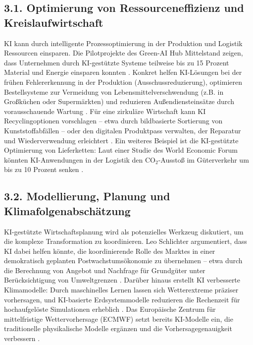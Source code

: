\documentclass[12pt, a4paper]{article}
\begin{document}
	\subsection*{3.1. Optimierung von Ressourceneffizienz und Kreislaufwirtschaft}
	KI kann durch intelligente Prozessoptimierung in der Produktion und Logistik
	Ressourcen einsparen.
	Die Pilotprojekte des Green-AI Hub Mittelstand zeigen, dass
	Unternehmen durch KI-gestützte Systeme teilweise bis zu 15 Prozent Material und
	Energie einsparen konnten \cite{greenai2025}.
	Konkret helfen KI-Lösungen bei der
	frühen Fehlererkennung in der Produktion (Ausschussreduzierung), optimieren
	Bestellsysteme zur Vermeidung von Lebensmittelverschwendung (z.B. in Großküchen oder
	Supermärkten) und reduzieren Außendiensteinsätze durch vorausschauende Wartung
	\cite{greenai2025}.
	Für eine zirkuläre Wirtschaft kann KI Recyclingoptionen
	vorschlagen – etwa durch bildbasierte Sortierung von Kunststoffabfällen – oder den
	digitalen Produktpass verwalten, der Reparatur und Wiederverwendung erleichtert
	\cite{greenai2025b}.
	Ein weiteres Beispiel ist die KI-gestützte Optimierung von
	Lieferketten: Laut einer Studie des World Economic Forum könnten KI-Anwendungen in
	der Logistik den CO$_2$-Ausstoß im Güterverkehr um bis zu 10 Prozent senken
	\cite{wef2024}.
	
	\subsection*{3.2. Modellierung, Planung und Klimafolgenabschätzung}
	KI-gestützte Wirtschaftsplanung wird als potenzielles Werkzeug diskutiert, um die
	komplexe Transformation zu koordinieren.
	Leo Schlichter argumentiert, dass KI dabei
	helfen könnte, die koordinierende Rolle des Marktes in einer demokratisch geplanten
	Postwachstumsökonomie zu übernehmen – etwa durch die Berechnung von Angebot und
	Nachfrage für Grundgüter unter Berücksichtigung von Umweltgrenzen \cite{postwachstumKI}.
	Darüber hinaus erstellt KI verbesserte Klimamodelle: Durch maschinelles Lernen lassen
	sich Wetterextreme präziser vorhersagen, und KI-basierte Erdsystemmodelle reduzieren
	die Rechenzeit für hochaufgelöste Simulationen erheblich \cite{ki-klimamodell2026}.
	Das Europäische Zentrum für mittelfristige Wettervorhersage (ECMWF) setzt bereits
	KI-Modelle ein, die traditionelle physikalische Modelle ergänzen und die
	Vorhersagegenauigkeit verbessern \cite{ecmwf2025}.
	
\end{document}

